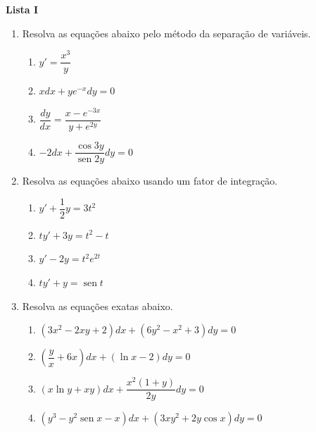 \documentclass[12pt,a4paper]{article}
\DeclareMathOperator{\sen}{sen}
\begin{document}
\begin{center}
  \textbf{Lista I}
\end{center}

\begin{enumerate}
  \item Resolva as equações abaixo pelo método da separação de variáveis.

  \begin{enumerate}
    \item $y' = \dfrac{x^3}{y}$
    \item $x dx + y e^{-x}dy = 0$
    \item $\dfrac{dy}{dx} = \dfrac{x - e^{-3x}}{y + e^{2y}}$
    \item $-2 dx + \dfrac{\cos 3y}{\sen 2y}dy = 0$
  \end{enumerate}

  \item Resolva as equações abaixo usando um fator de integração.

  \begin{enumerate}
    \item $y' + \dfrac{1}{2}y = 3t^2$
    \item $ty'+ 3y = t^2 - t$
    \item $y' - 2y = t^2e^{2t}$
    \item $ty' + y = \sen t$
  \end{enumerate}

  \item Resolva as equações exatas abaixo.

  \begin{enumerate}
    \item $(3x^2 - 2xy + 2)dx + (6y^2 - x^2 + 3)dy = 0$
    \item $\left(\dfrac{y}{x} + 6x\right)dx + (\ln x - 2)dy = 0$
    \item $(x\ln y + xy)dx + \dfrac{x^2(1 + y)}{2y}dy = 0$
    \item $(y^3 - y^2\sen x - x)dx + (3xy^2 + 2y\cos x)dy=0$
  \end{enumerate}
  
\end{enumerate}
\end{document}
